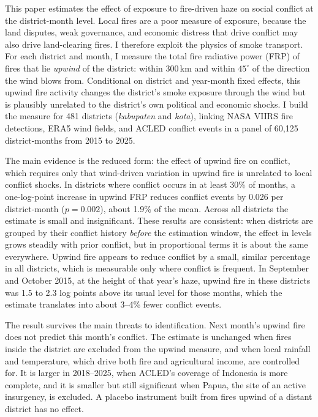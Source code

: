 \documentclass[12pt]{article}
\begin{document}
This paper estimates the effect of exposure to fire-driven haze on social conflict at the district-month level. Local fires are a poor measure of exposure, because the land disputes, weak governance, and economic distress that drive conflict may also drive land-clearing fires. I therefore exploit the physics of smoke transport. For each district and month, I measure the total fire radiative power (FRP) of fires that lie \emph{upwind} of the district: within 300\,km and within $45^{\circ}$ of the direction the wind blows from. Conditional on district and year-month fixed effects, this upwind fire activity changes the district's smoke exposure through the wind but is plausibly unrelated to the district's own political and economic shocks. I build the measure for 481 districts (\emph{kabupaten} and \emph{kota}), linking NASA VIIRS fire detections, ERA5 wind fields, and ACLED conflict events in a panel of 60,125 district-months from 2015 to 2025.

The main evidence is the reduced form: the effect of upwind fire on conflict, which requires only that wind-driven variation in upwind fire is unrelated to local conflict shocks. In districts where conflict occurs in at least 30\% of months, a one-log-point increase in upwind FRP reduces conflict events by 0.026 per district-month ($p=0.002$), about 1.9\% of the mean. Across all districts the estimate is small and insignificant. These results are consistent: when districts are grouped by their conflict history \emph{before} the estimation window, the effect in levels grows steadily with prior conflict, but in proportional terms it is about the same everywhere. Upwind fire appears to reduce conflict by a small, similar percentage in all districts, which is measurable only where conflict is frequent. In September and October 2015, at the height of that year's haze, upwind fire in these districts was 1.5 to 2.3 log points above its usual level for those months, which the estimate translates into about 3--4\% fewer conflict events.

The result survives the main threats to identification. Next month's upwind fire does not predict this month's conflict. The estimate is unchanged when fires inside the district are excluded from the upwind measure, and when local rainfall and temperature, which drive both fire and agricultural income, are controlled for. It is larger in 2018--2025, when ACLED's coverage of Indonesia is more complete, and it is smaller but still significant when Papua, the site of an active insurgency, is excluded. A placebo instrument built from fires upwind of a distant district has no effect.
\end{document}
